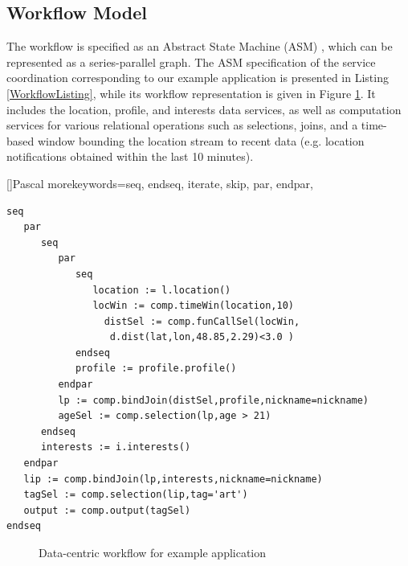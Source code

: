 \subsection{Workflow Model}\label{subsec:workflowModel}

The workflow is specified as an Abstract State Machine (ASM) \cite{Gurevich:1995:EAL:233976.233979}, which can be represented as a series-parallel graph. The ASM specification of the service coordination corresponding to our example application is presented in Listing \ref{WorkflowListing}, while its workflow representation is given in Figure \ref{fig:servCoorExample}. It includes the location, profile, and interests data services, as well as computation services for various relational operations such as selections, joins, and a time-based window bounding the location stream to recent data (e.g. location notifications obtained within the last 10 minutes).

[]{Pascal}{
   morekeywords={seq, endseq, iterate, skip, par, endpar},
}

\lstset{language=AbStM,showstringspaces=false}
\begin{lstlisting}[caption={ASM specification for example application},label=WorkflowListing]
seq
   par
      seq
         par
            seq
               location := l.location()
               locWin := comp.timeWin(location,10)
	             distSel := comp.funCallSel(locWin, 
	              d.dist(lat,lon,48.85,2.29)<3.0 )
            endseq
            profile := profile.profile()
         endpar
         lp := comp.bindJoin(distSel,profile,nickname=nickname)
         ageSel := comp.selection(lp,age > 21)
      endseq
      interests := i.interests()
   endpar
   lip := comp.bindJoin(lp,interests,nickname=nickname)
   tagSel := comp.selection(lip,tag='art')
   output := comp.output(tagSel)
endseq
\end{lstlisting}

\begin{figure}
	\centering
		\caption{Data-centric workflow for example application}
		\label{fig:servCoorExample}
\end{figure}

